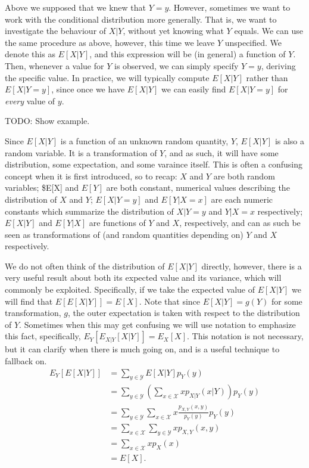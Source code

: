 \documentclass[
  letterpaper,
  DIV=11,
  numbers=noendperiod]{scrreprt}
\begin{document}
Above we supposed that we knew that \(Y=y\). However, sometimes we want
to work with the conditional distribution more generally. That is, we
want to investigate the behaviour of \(X|Y\), without yet knowing what
\(Y\) equals. We can use the same procedure as above, however, this time
we leave \(Y\) unspecified. We denote this as \(E[X|Y]\), and this
expression will be (in general) a function of \(Y\). Then, whenever a
value for \(Y\) is observed, we can simply specify \(Y=y\), deriving the
specific value. In practice, we will typically compute \(E[X|Y]\) rather
than \(E[X|Y=y]\), since once we have \(E[X|Y]\) we can easily find
\(E[X|Y=y]\) for \emph{every} value of \(y\).

TODO: Show example.

Since \(E[X|Y]\) is a function of an unknown random quantity, \(Y\),
\(E[X|Y]\) is also a random variable. It is a transformation of \(Y\),
and as such, it will have some distribution, some expectation, and some
varaince itself. This is often a confusing concept when it is first
introduced, so to recap: \(X\) and \(Y\) are both random variables;
\$E{[}X{]} and \(E[Y]\) are both constant, numerical values describing
the distribution of \(X\) and \(Y\); \(E[X|Y=y]\) and \(E[Y|X=x]\) are
each numeric constants which summarize the distribution of \(X|Y=y\) and
\(Y|X=x\) respectively; \(E[X|Y]\) and \(E[Y|X]\) are functions of \(Y\)
and \(X\), respectively, and can as such be seen as transformations of
(and random quantities depending on) \(Y\) and \(X\) respectively.

We do not often think of the distribution of \(E[X|Y]\) directly,
however, there is a very useful result about both its expected value and
its variance, which will commonly be exploited. Specifically, if we take
the expected value of \(E[X|Y]\) we will find that \(E[E[X|Y]] = E[X]\).
Note that since \(E[X|Y] = g(Y)\) for some transformation, \(g\), the
outer expectation is taken with respect to the distribution of \(Y\).
Sometimes when this may get confusing we will use notation to emphasize
this fact, specifically, \(E_Y[E_{X|Y}[X|Y]] = E_X[X]\). This notation
is not necessary, but it can clarify when there is much going on, and is
a useful technique to fallback on. \begin{align*}
E_Y[E[X|Y]] &= \sum_{y\in\mathcal{Y}} E[X|Y]p_Y(y) \\
&= \sum_{y\in\mathcal{Y}}\left(\sum_{x\in\mathcal{X}}xp_{X|Y}(x|Y)\right)p_Y(y) \\
&= \sum_{y\in\mathcal{Y}}\sum_{x\in\mathcal{X}}x\frac{p_{X,Y}(x,y)}{p_Y(y)}p_Y(y)\\
&= \sum_{x\in\mathcal{X}}\sum_{y\in\mathcal{Y}}xp_{X,Y}(x,y)\\
&= \sum_{x\in\mathcal{X}} xp_X(x)\\
&= E[X].\end{align*}
\end{document}
